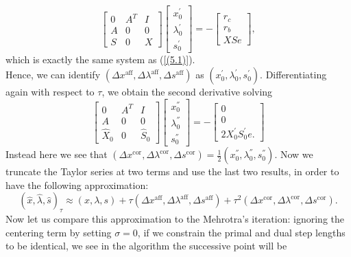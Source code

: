 \documentclass[a4paper,10 pt,titlepage,twoside]{report}
\theoremstyle{plain}
\theoremstyle{definition}
\theoremstyle{remark}
\begin{document}
{{\begin{equation*}
\begin{bmatrix}
0&A^{T}&I \\A&0&0\\S&0&X
\end{bmatrix}\begin{bmatrix}
x_{0}^{'}\\\lambda_{0}^{'}\\s_{0}^{'}
\end{bmatrix}=-\begin{bmatrix}
r_{c}\\r_{b}\\XSe
\end{bmatrix},
\end{equation*}
which is exactly the same system as (\ref{(5.1)}).\\
Hence, we can identify $(\Delta x^{\text{aff}},\Delta \lambda^{\text{aff}},\Delta s^{\text{aff}})$ as $(x^{'}_{0},\lambda^{'}_{0},s^{'}_{0})$. Differentiating again with respect to $\tau$, we obtain the second derivative solving
\begin{equation*}
\begin{bmatrix}
0&A^{T}&I \\A&0&0\\\hat{X}_{0}&0&\hat{S}_{0}
\end{bmatrix}\begin{bmatrix}
x_{0}^{''}\\\lambda_{0}^{''}\\s_{0}^{''}
\end{bmatrix}=-\begin{bmatrix}
0\\0\\2X^{'}_{0}S^{'}_{0}e.
\end{bmatrix}
\end{equation*}
Instead here we see that $(\Delta x^{\text{cor}},\Delta \lambda^{\text{cor}},\Delta s^{\text{cor}})=\frac{1}{2}(x^{''}_{0},\lambda^{''}_{0},s^{''}_{0})$. Now we truncate the Taylor series at two terms and use the last two results, in order to have the following approximation:
\begin{equation*}
(\hat{x},\hat{\lambda},\hat{s})_{\tau}\approx(x, \lambda, s)+ \tau(\Delta x^{\text{aff}},\Delta \lambda^{\text{aff}},\Delta s^{\text{aff}})+\tau^{2}(\Delta x^{\text{cor}},\Delta \lambda^{\text{cor}},\Delta s^{\text{cor}}).
\end{equation*}
Now let us compare this approximation to the Mehrotra's iteration: ignoring the centering term by setting $\sigma =0$, if we constrain the primal and dual step lengths to be identical, we see in the algorithm the successive point will be
}}
\end{document}
